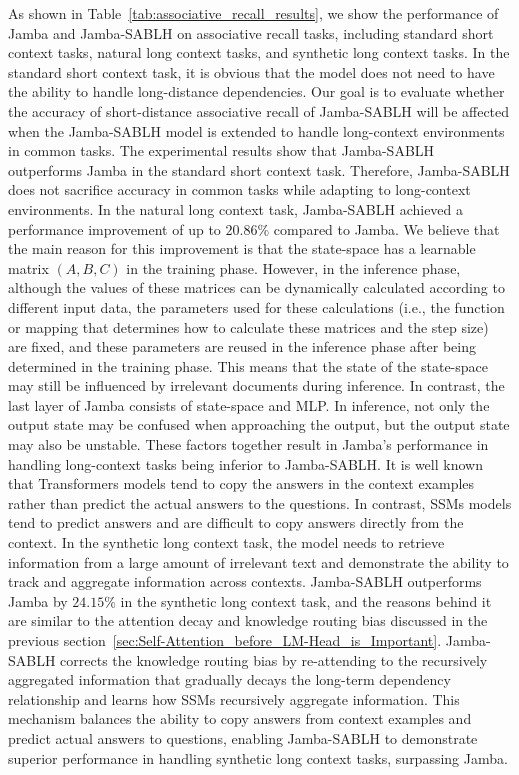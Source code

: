 \documentclass{article}
\theoremstyle{plain}
\theoremstyle{definition}
\theoremstyle{remark}
\begin{document}
As shown in Table~\ref{tab:associative_recall_results}, we show the performance of Jamba and Jamba-SABLH on associative recall tasks, including standard short context tasks, natural long context tasks, and synthetic long context tasks. In the standard short context task, it is obvious that the model does not need to have the ability to handle long-distance dependencies. Our goal is to evaluate whether the accuracy of short-distance associative recall of Jamba-SABLH will be affected when the Jamba-SABLH model is extended to handle long-context environments in common tasks. The experimental results show that Jamba-SABLH outperforms Jamba in the standard short context task. Therefore, Jamba-SABLH does not sacrifice accuracy in common tasks while adapting to long-context environments. In the natural long context task, Jamba-SABLH achieved a performance improvement of up to $20.86\%$ compared to Jamba. We believe that the main reason for this improvement is that the state-space has a learnable matrix $(A, B, C)$ in the training phase. However, in the inference phase, although the values of these matrices can be dynamically calculated according to different input data, the parameters used for these calculations (i.e., the function or mapping that determines how to calculate these matrices and the step size) are fixed, and these parameters are reused in the inference phase after being determined in the training phase. This means that the state of the state-space may still be influenced by irrelevant documents during inference. In contrast, the last layer of Jamba consists of state-space and MLP. In inference, not only the output state may be confused when approaching the output, but the output state may also be unstable. These factors together result in Jamba's performance in handling long-context tasks being inferior to Jamba-SABLH. It is well known that Transformers models tend to copy the answers in the context examples rather than predict the actual answers to the questions. In contrast, SSMs models tend to predict answers and are difficult to copy answers directly from the context. In the synthetic long context task, the model needs to retrieve information from a large amount of irrelevant text and demonstrate the ability to track and aggregate information across contexts. Jamba-SABLH outperforms Jamba by $24.15\%$ in the synthetic long context task, and the reasons behind it are similar to the attention decay and knowledge routing bias discussed in the previous section~\ref{sec:Self-Attention_before_LM-Head_is_Important}. Jamba-SABLH corrects the knowledge routing bias by re-attending to the recursively aggregated information that gradually decays the long-term dependency relationship and learns how SSMs recursively aggregate information. This mechanism balances the ability to copy answers from context examples and predict actual answers to questions, enabling Jamba-SABLH to demonstrate superior performance in handling synthetic long context tasks, surpassing Jamba.
\end{document}
